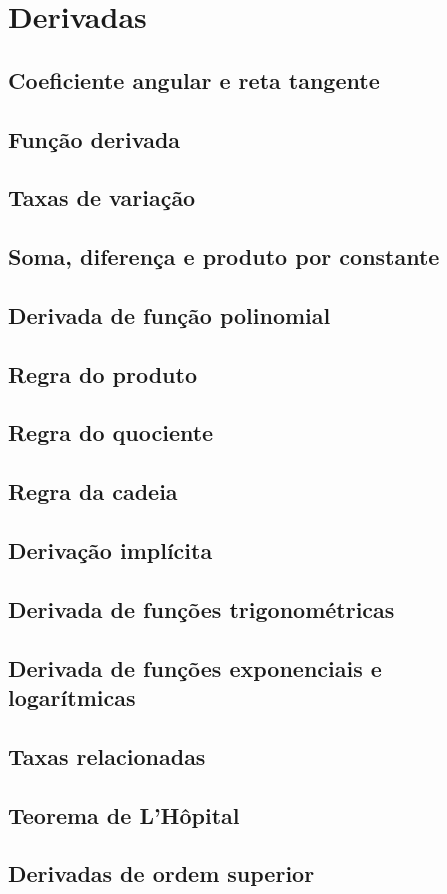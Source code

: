 
\chapter{Derivadas}\label{chap:derivadas}

\emconstrucao


\section{Coeficiente angular e reta tangente}\label{sec:derivadas_coef_angular}

\section{Função derivada}

\section{Taxas de variação}

\section{Soma, diferença e produto por constante}
\section{Derivada de função polinomial}
\section{Regra do produto}
\section{Regra do quociente}
\section{Regra da cadeia}
\section{Derivação implícita}
\section{Derivada de funções trigonométricas}
\section{Derivada de funções exponenciais e logarítmicas}
\section{Taxas relacionadas}
\section{Teorema de L'Hôpital}
\section{Derivadas de ordem superior}


\construirSec
